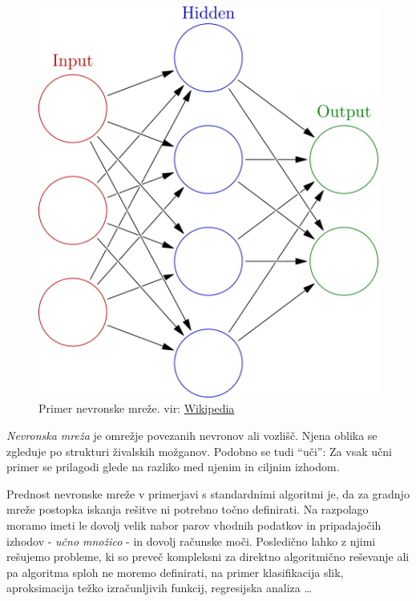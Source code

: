 \documentclass[a4paper,11pt,titlepage]{article}
\begin{document}
\begin{figure}[htbp]
\begin{center}
\includegraphics[scale=0.25]{neural_network.png}
\caption{Primer nevronske mreže. vir:
	\href{https://en.wikipedia.org/wiki/Artificial\_neural\_network\#/media/File:Colored\_neural\_network.svg}{Wikipedia}}
\label{slika1}
\end{center}
\end{figure}
\emph{Nevronska mreža} je omrežje povezanih nevronov ali vozlišč.\cite{ann_def_1}
Njena oblika se zgleduje po strukturi živalskih možganov.\cite{ann_def_2}
Podobno se tudi ``uči'': Za vsak učni primer se prilagodi glede na razliko med njenim in ciljnim izhodom.

Prednost nevronske mreže v primerjavi s standardnimi algoritmi je, da za gradnjo mreže postopka iskanja rešitve ni potrebno točno definirati.
Na razpolago moramo imeti le dovolj velik nabor parov vhodnih podatkov in pripadajočih izhodov - \emph{učno množico} - in dovolj računske moči.
Posledično lahko z njimi rešujemo probleme, ki so preveč kompleksni za direktno algoritmično reševanje ali pa algoritma sploh ne moremo definirati,
	na primer klasifikacija slik, aproksimacija težko izračunljivih funkcij, regresijska analiza \ldots
\end{document}
